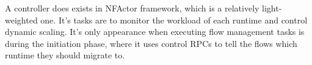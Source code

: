 A controller does exists in NFActor framework, which is a relatively light-weighted one. It's tasks are to monitor the workload of each runtime and control dynamic scaling. It's only appearance when executing flow management tasks is during the initiation phase, where it uses control RPCs to tell the flows which runtime they should migrate to.
